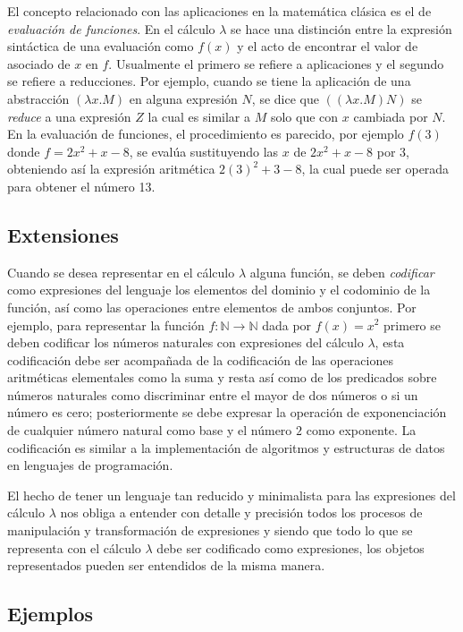 El concepto relacionado con las aplicaciones en la matemática clásica es el de \emph{evaluación de funciones}. En el cálculo \( λ \) se hace una distinción entre la expresión sintáctica de una evaluación como \( f(x) \) y el acto de encontrar el valor de asociado de \( x \) en \( f \). Usualmente el primero se refiere a aplicaciones y el segundo se refiere a reducciones. Por ejemplo, cuando se tiene la aplicación de una abstracción \( (λx.M) \) en alguna expresión \( N \), se dice que \( ((λx.M) N) \) se \emph{reduce} a una expresión \( Z \) la cual es similar a \( M \) solo que con \( x \) cambiada por \( N \). En la evaluación de funciones, el procedimiento es parecido, por ejemplo \( f(3) \) donde \( f = 2x^{2}+x-8 \), se evalúa sustituyendo las \( x \) de \( 2x^{2}+x-8 \) por 3, obteniendo así la expresión aritmética \( 2(3)^{2}+3-8 \), la cual puede ser operada para obtener el número 13.

\subsection{Extensiones}
\label{sec:extensiones}

Cuando se desea representar en el cálculo \( λ \) alguna función, se deben \emph{codificar} como expresiones del lenguaje los elementos del dominio y el codominio de la función, así como las operaciones entre elementos de ambos conjuntos. Por ejemplo, para representar la función \( f \colon \mathbb{N} \to \mathbb{N} \) dada por \( f(x)=x^{2} \) primero se deben codificar los números naturales con expresiones del cálculo \( λ \), esta codificación debe ser acompañada de la codificación de las operaciones aritméticas elementales como la suma y resta así como de los predicados sobre números naturales como discriminar entre el mayor de dos números o si un número es cero; posteriormente se debe expresar la operación de exponenciación de cualquier número natural como base y el número \( 2 \) como exponente. La codificación es similar a la implementación de algoritmos y estructuras de datos en lenguajes de programación.

El hecho de tener un lenguaje tan reducido y minimalista para las expresiones del cálculo \( λ \) nos obliga a entender con detalle y precisión todos los procesos de manipulación y transformación de expresiones y siendo que todo lo que se representa con el cálculo \( λ \) debe ser codificado como expresiones, los objetos representados pueden ser entendidos de la misma manera.


\subsection{Ejemplos}
\label{sec:ejemplos}

